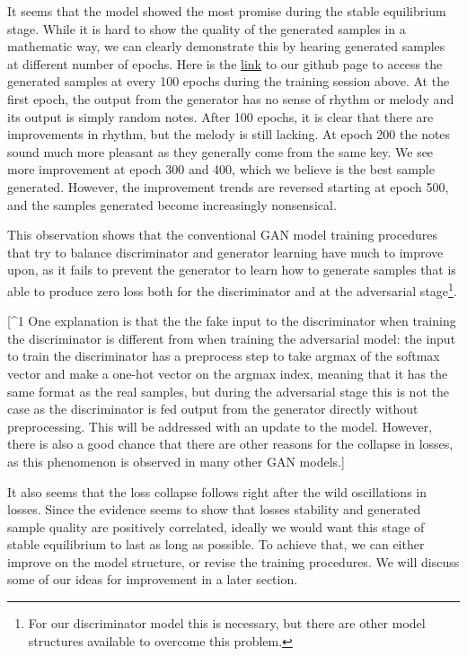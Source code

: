 \documentclass[12pt,oneside]{chicagocapstone}
\begin{document}
It seems that the model showed the most promise during the stable equilibrium stage. While it is hard to show the quality of the generated samples in a mathematic way, we can clearly demonstrate this by hearing generated samples at different number of epochs. Here is the \href{https://github.com/terrywang15/museG_dev/tree/master/2020-01-31\%2002-20}{link} to our github page to access the generated samples at every 100 epochs during the training session above. At the first epoch, the output from the generator has no sense of rhythm or melody and its output is simply random notes. After 100 epochs, it is clear that there are improvements in rhythm, but the melody is still lacking. At epoch 200 the notes sound much more pleasant as they generally come from the same key. We see more improvement at epoch 300 and 400, which we believe is the best sample generated. However, the improvement trends are reversed starting at epoch 500, and the samples generated become increasingly nonsensical.

This observation shows that the conventional GAN model training procedures that try to balance discriminator and generator learning have much to improve upon, as it fails to prevent the generator to learn how to generate samples that is able to produce zero loss both for the discriminator and at the adversarial stage\footnote{For our discriminator model this is necessary, but there are other model structures available to overcome this problem.}.

{[}\^{}1 One explanation is that the the fake input to the discriminator when training the discriminator is different from when training the adversarial model: the input to train the discriminator has a preprocess step to take argmax of the softmax vector and make a one-hot vector on the argmax index, meaning that it has the same format as the real samples, but during the adversarial stage this is not the case as the discriminator is fed output from the generator directly without preprocessing. This will be addressed with an update to the model. However, there is also a good chance that there are other reasons for the collapse in losses, as this phenomenon is observed in many other GAN models.{]}

It also seems that the loss collapse follows right after the wild oscillations in losses. Since the evidence seems to show that losses stability and generated sample quality are positively correlated, ideally we would want this stage of stable equilibrium to last as long as possible. To achieve that, we can either improve on the model structure, or revise the training procedures. We will discuss some of our ideas for improvement in a later section.
\end{document}

